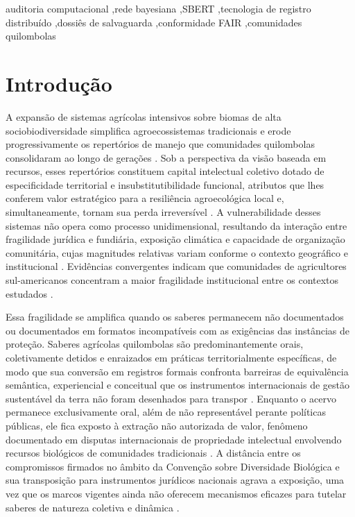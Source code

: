 \documentclass[preprint,12pt,authoryear]{elsarticle}
\begin{document}
\begin{frontmatter}
\begin{keyword}
auditoria computacional \sep rede bayesiana \sep SBERT \sep tecnologia de registro distribuído \sep dossiês de salvaguarda \sep conformidade FAIR \sep comunidades quilombolas
\end{keyword}

\end{frontmatter}

\linenumbers

\section{Introdução}

A expansão de sistemas agrícolas intensivos sobre biomas de alta sociobiodiversidade simplifica agroecossistemas tradicionais e erode progressivamente os repertórios de manejo que comunidades quilombolas consolidaram ao longo de gerações \citep{Altieri2004}. Sob a perspectiva da visão baseada em recursos, esses repertórios constituem capital intelectual coletivo dotado de especificidade territorial e insubstitutibilidade funcional, atributos que lhes conferem valor estratégico para a resiliência agroecológica local e, simultaneamente, tornam sua perda irreversível \citep{Barney1991,Laborde2023,Ens2016}. A vulnerabilidade desses sistemas não opera como processo unidimensional, resultando da interação entre fragilidade jurídica e fundiária, exposição climática e capacidade de organização comunitária, cujas magnitudes relativas variam conforme o contexto geográfico e institucional \citep{ReyesGarcia2013,GomezBaggethun2013,Santilli2009}. Evidências convergentes indicam que comunidades de agricultores sul-americanos concentram a maior fragilidade institucional entre os contextos estudados \citep{TangGavin2016,CamaraLeret2021}.

Essa fragilidade se amplifica quando os saberes permanecem não documentados ou documentados em formatos incompatíveis com as exigências das instâncias de proteção. Saberes agrícolas quilombolas são predominantemente orais, coletivamente detidos e enraizados em práticas territorialmente específicas, de modo que sua conversão em registros formais confronta barreiras de equivalência semântica, experiencial e conceitual que os instrumentos internacionais de gestão sustentável da terra não foram desenhados para transpor \citep{Altieri2004,ReyesGarcia2013}. Enquanto o acervo permanece exclusivamente oral, além de não representável perante políticas públicas, ele fica exposto à extração não autorizada de valor, fenômeno documentado em disputas internacionais de propriedade intelectual envolvendo recursos biológicos de comunidades tradicionais \citep{Wynberg2015}. A distância entre os compromissos firmados no âmbito da Convenção sobre Diversidade Biológica e sua transposição para instrumentos jurídicos nacionais agrava a exposição, uma vez que os marcos vigentes ainda não oferecem mecanismos eficazes para tutelar saberes de natureza coletiva e dinâmica \citep{Laird2020,Santilli2009}.
\end{document}
